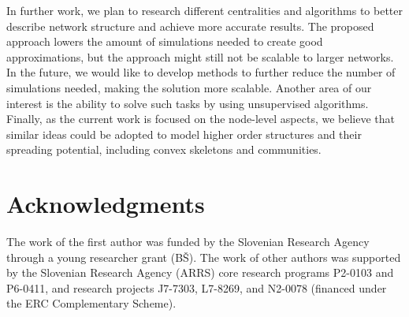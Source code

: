\documentclass{article}
\begin{document}
In further work, we plan to research different centralities and algorithms to better describe network structure and achieve more accurate results. The proposed approach lowers the amount of simulations needed to create good approximations, but the approach might still not be scalable to larger networks. In the future, we would like to develop methods to further reduce the number of simulations needed, making the solution more scalable. Another area of our interest is the ability to solve such tasks by using unsupervised algorithms. Finally, as the current work is focused on the node-level aspects, we believe that similar ideas could be adopted to model higher order structures and their spreading potential, including convex skeletons and communities.

\section*{Acknowledgments}
The work of the first author was funded by the Slovenian Research Agency through a young researcher grant (B\v{S}).
The work of other authors was supported by the Slovenian Research Agency (ARRS) core research programs P2-0103 and P6-0411, 
and research projects J7-7303, L7-8269, and N2-0078 (financed under the ERC Complementary Scheme).



\end{document}

